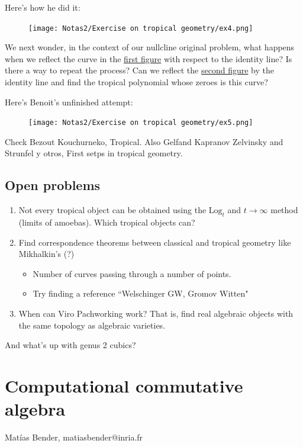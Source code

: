 \documentclass{article}
\theoremstyle{definition}
\newcommand{\Log}{\text{Log}}
\begin{document}
 Here's how he did it:

 \begin{figure}[H]
		\centering
        \texttt{[image: Notas2/Exercise on tropical geometry/ex4.png]}
		\label{fig:ex4}
	\end{figure}

 We next wonder, in the context of our nullcline original problem, what happens when we reflect the curve in the \hyperref[ex1]{first figure} with respect to the identity line? Is there a way to repeat the process? Can we reflect the \hyperref[ex2]{second figure} by the identity line and find the tropical polynomial whose zeroes is this curve?\par
 Here's Benoit's unfinished attempt:

\begin{figure}[H]
		\centering
        \texttt{[image: Notas2/Exercise on tropical geometry/ex5.png]}
		\label{ex5}
	\end{figure}
 
	Check Bezout Kouchurneko, Tropical. Also Gelfand Kapranov Zelvinsky and Strunfel y otros, First setps in tropical geometry.	
\subsection{Open problems}
\begin{enumerate}
    \item Not every tropical object can be obtained using the $\Log_t$ and $t\to\infty$ method (limits of amoebas). Which tropical objects can?
    \item Find correspondence theorems between classical and tropical geometry like Mikhalkin's (\cite{mikhalkin2006tropical}?)
    \begin{itemize}
        \item  Number of curves passing through a number of points.
        \item Try finding a reference ``Welschinger GW, Gromov Witten"
    \end{itemize}
    \item When can Viro Pachworking work? That is, find real algebraic objects with the same topology as algebraic varieties.
\end{enumerate}
And what's up with genus 2 cubics?
\newpage

\newpage
\section{Computational commutative algebra}
Matías Bender, matiasbender@inria.fr
\end{document}
